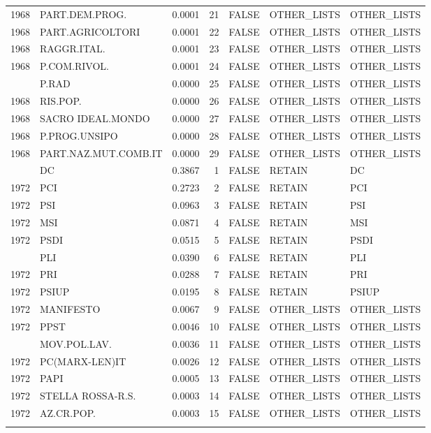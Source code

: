 \begin{longtable}[t]{rlrrlll}
1968 & PART.DEM.PROG. & 0.0001 & 21 & FALSE & OTHER\_LISTS & OTHER\_LISTS\\
1968 & PART.AGRICOLTORI & 0.0001 & 22 & FALSE & OTHER\_LISTS & OTHER\_LISTS\\
1968 & RAGGR.ITAL. & 0.0001 & 23 & FALSE & OTHER\_LISTS & OTHER\_LISTS\\
1968 & P.COM.RIVOL. & 0.0001 & 24 & FALSE & OTHER\_LISTS & OTHER\_LISTS\\
\addlinespace
1968 & P.RAD & 0.0000 & 25 & FALSE & OTHER\_LISTS & OTHER\_LISTS\\
1968 & RIS.POP. & 0.0000 & 26 & FALSE & OTHER\_LISTS & OTHER\_LISTS\\
1968 & SACRO IDEAL.MONDO & 0.0000 & 27 & FALSE & OTHER\_LISTS & OTHER\_LISTS\\
1968 & P.PROG.UNSIPO & 0.0000 & 28 & FALSE & OTHER\_LISTS & OTHER\_LISTS\\
1968 & PART.NAZ.MUT.COMB.IT & 0.0000 & 29 & FALSE & OTHER\_LISTS & OTHER\_LISTS\\
\addlinespace
1972 & DC & 0.3867 & 1 & FALSE & RETAIN & DC\\
1972 & PCI & 0.2723 & 2 & FALSE & RETAIN & PCI\\
1972 & PSI & 0.0963 & 3 & FALSE & RETAIN & PSI\\
1972 & MSI & 0.0871 & 4 & FALSE & RETAIN & MSI\\
1972 & PSDI & 0.0515 & 5 & FALSE & RETAIN & PSDI\\
\addlinespace
1972 & PLI & 0.0390 & 6 & FALSE & RETAIN & PLI\\
1972 & PRI & 0.0288 & 7 & FALSE & RETAIN & PRI\\
1972 & PSIUP & 0.0195 & 8 & FALSE & RETAIN & PSIUP\\
1972 & MANIFESTO & 0.0067 & 9 & FALSE & OTHER\_LISTS & OTHER\_LISTS\\
1972 & PPST & 0.0046 & 10 & FALSE & OTHER\_LISTS & OTHER\_LISTS\\
\addlinespace
1972 & MOV.POL.LAV. & 0.0036 & 11 & FALSE & OTHER\_LISTS & OTHER\_LISTS\\
1972 & PC(MARX-LEN)IT & 0.0026 & 12 & FALSE & OTHER\_LISTS & OTHER\_LISTS\\
1972 & PAPI & 0.0005 & 13 & FALSE & OTHER\_LISTS & OTHER\_LISTS\\
1972 & STELLA ROSSA-R.S. & 0.0003 & 14 & FALSE & OTHER\_LISTS & OTHER\_LISTS\\
1972 & AZ.CR.POP. & 0.0003 & 15 & FALSE & OTHER\_LISTS & OTHER\_LISTS\\
\addlinespace

\end{longtable}
